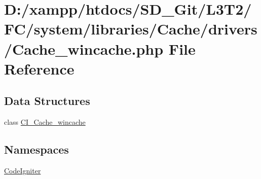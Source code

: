 \hypertarget{system_2libraries_2_cache_2drivers_2_cache__wincache_8php}{}\section{D\+:/xampp/htdocs/\+S\+D\+\_\+\+Git/\+L3\+T2/\+F\+C/system/libraries/\+Cache/drivers/\+Cache\+\_\+wincache.php File Reference}
\label{system_2libraries_2_cache_2drivers_2_cache__wincache_8php}
\subsection*{Data Structures}
\begin{DoxyCompactItemize}
\item 
class \hyperlink{class_c_i___cache__wincache}{C\+I\+\_\+\+Cache\+\_\+wincache}
\end{DoxyCompactItemize}
\subsection*{Namespaces}
\begin{DoxyCompactItemize}
\item 
 \hyperlink{namespace_code_igniter}{Code\+Igniter}
\end{DoxyCompactItemize}
